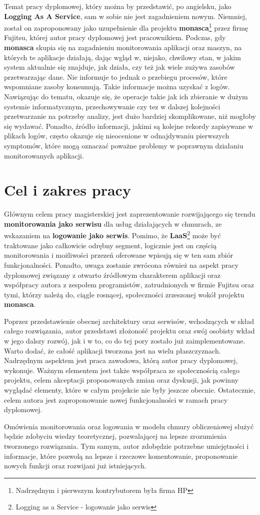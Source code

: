 Temat pracy dyplomowej, który można by przedstawić, po angielsku, jako \textbf{Logging As A Service}, sam w sobie nie jest zagadnieniem
nowym. Niemniej, został on zaproponowany jako uzupełnienie dla projektu \textbf{monasca}\footnote{Nadrzędnym i pierwszym kontrybutorem była firma HP} przez
firmę Fujitsu, której autor pracy dyplomowej jest pracownikiem. 
Podczas, gdy \textbf{monasca} skupia się na zagadnieniu monitorowania aplikacji oraz maszyn, na których te aplikacje działają, dając wgląd w, niejako,
chwilowy stan, w jakim system aktualnie się znajduje, jak działa, czy też jak wiele zużywa zasobów przetwarzając dane. Nie informuje to jednak o 
przebiegu procesów, które wspomniane zasoby konsumują. Takie informacje można uzyskać z logów. Nawiązując do tematu, okazuje się, że operacje takie jak 
ich zbieranie w dużym systemie informatycznym, przechowywanie czy tez w dalszej kolejności przetwarzanie na potrzeby analizy, jest dużo bardziej 
skomplikowane, niż mogłoby się wydawać. Ponadto, źródło informacji, jakimi są kolejne rekordy zapisywane w plikach logów, często okazuje się nieocenione w 
odnajdywaniu pierwszych symptomów, które mogą oznaczać poważne problemy w poprawnym działaniu monitorowanych aplikacji.

\section{Cel i zakres pracy}

Głównym celem pracy magisterskiej jest zaprezentowanie rozwijającego się trendu \textbf{monitorowania jako serwisu} dla usług działających w chmurach,
ze wskazaniem na \textbf{logowanie jako serwis}. Pomimo, że \textbf{LaaS}\footnote{Logging as a Service - logowanie jako serwis} 
może być traktowane jako całkowicie odrębny segment, logicznie jest on częścią monitorowania i możliwości przezeń oferowane wpisują się w ten sam
zbiór funkcjonalności. Ponadto, uwaga zostanie zwrócona również na aspekt pracy dyplomowej związany z otwarto źródłowym charakterem aplikacji oraz
współpracy autora z zespołem programistów, zatrudnionych w firmie Fujitsu oraz tymi, którzy należą do, ciągle rosnącej, społeczności zrzeszonej wokół
projektu \textbf{monasca}. 

Poprzez przedstawienie obecnej architektury oraz serwisów, wchodzących w skład całego rozwiązania, autor przedstawi złożoność projektu
oraz swój osobisty wkład w jego dalszy rozwój, jak i w to, co do tej pory zostało już zaimplementowane. Warto dodać, że całość
aplikacji tworzona jest na wielu płaszczyznach. Nadrzędnym aspektem jest praca zawodowa, którą autor pracy dyplomowej, wykonuje.
Ważnym elementem jest także współpraca ze społecznością całego projektu, celem akceptacji proponowanych zmian
oraz dyskusji, jak powinny wyglądać elementy, które w całym projekcie nie były jeszcze obecnie. Ostatecznie, celem autora 
jest zaproponowanie nowej funkcjonalności w ramach pracy dyplomowej.

Omówienia monitorowania oraz logowania w modelu chmury obliczeniowej służyć będzie zdobyciu wiedzy
teoretycznej, pozwalającej na lepsze zrozumienia tworzonego rozwiązania. Tym samym, autor zdobędzie potrzebne umiejętności i informacje, 
które pozwolą na lepsze i rzeczowe komentowanie, proponowanie nowych funkcji oraz rozwijani już istniejących.  
